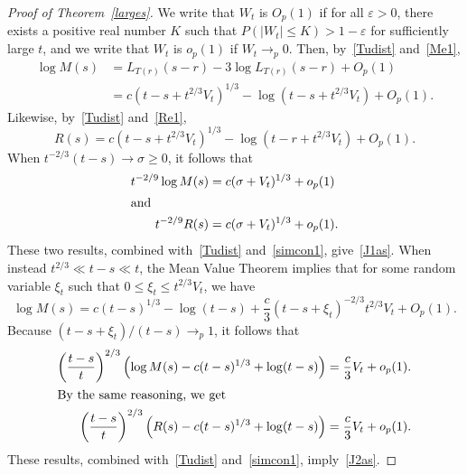 \documentclass[10pt]{amsart}
\theoremstyle{definition}\newtheorem{defi}[theo]{Definition}\newtheorem{rema}[theo]{Remark}\newtheorem{exam}[theo]{Example}\newtheorem{exem}[theo]{Example}\newtheorem{nota}[theo]{Notation}
\newcommand*\eps{\varepsilon}
\newcommand{\1} {\mathds{1}}
\renewcommand*\to{\rightarrow}
\begin{document}
\begin{proof}[Proof of Theorem~\ref{larges}]
We write that $W_t$ is $O_p(1)$ if for all $\eps > 0$, there exists a positive real number $K$ such that $P(|W_t| \leq K) > 1 - \eps$ for sufficiently large $t$, and we write that $W_t$ is $o_p(1)$ if $W_t \rightarrow_p 0$. Then, by~\eqref{Tudist} and~\eqref{Me1},
\begin{align*}
\log M(s) &= L_{T(r)}(s - r) - 3 \log L_{T(r)}(s - r) + O_p(1) \\
&= c\left(t - s + t^{2/3} V_t\right)^{1/3} - \log \left(t - s + t^{2/3} V_t\right) + O_p(1).
\end{align*}
Likewise, by~\eqref{Tudist} and~\eqref{Re1},
\[
R(s) = c \left(t - s + t^{2/3} V_t\right)^{1/3} - \log \left(t - r + t^{2/3} V_t\right) + O_p(1).
\]
When $t^{-2/3}(t - s) \to \sigma \geq 0$, it follows that
\begin{align*}
t^{-2/9} \log M(s) &= c(\sigma + V_t)^{1/3} + o_p(1)
\\
\intertext{and}
t^{-2/9} R(s) &= c(\sigma + V_t)^{1/3} + o_p(1).
\end{align*}
These two results, combined with~\eqref{Tudist} and~\eqref{simcon1}, give~\eqref{J1as}.
When instead $t^{2/3} \ll t - s \ll t$, the Mean Value Theorem implies that for some random variable $\xi_t$ such that $0 \leq \xi_t \leq t^{2/3} V_t$, we have
\[
\log M(s) = c (t - s)^{1/3} - \log(t - s) + \frac{c}{3} \left(t - s + \xi_t\right)^{-2/3} t^{2/3} V_t + O_p(1).
\]
Because $(t - s + \xi_t)/(t - s) \rightarrow_p 1$, it follows that
\begin{align*}
\left(\frac{t - s}{t} \right)^{2/3} \left(\log M(s) - c(t - s)^{1/3} + \log(t - s) \right) &= \frac{c}{3} V_t + o_p(1).
\\
\intertext{By the same reasoning, we get}
\left(\frac{t - s}{t} \right)^{2/3} \left(R(s) - c(t - s)^{1/3} + \log(t - s) \right) &= \frac{c}{3} V_t + o_p(1).
\end{align*}
These results, combined with~\eqref{Tudist} and~\eqref{simcon1}, imply~\eqref{J2as}.
\end{proof}
\end{document}
